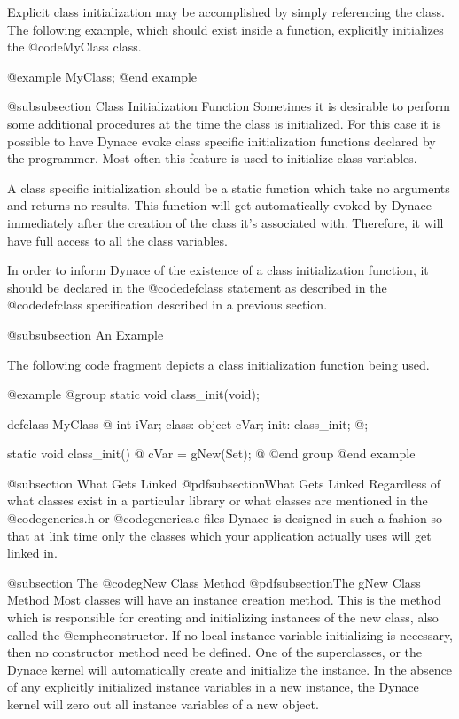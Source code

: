 Explicit class initialization may be accomplished by simply referencing
the class.  The following example, which should exist inside a function,
explicitly initializes the @code{MyClass} class.

@example
        MyClass;
@end example

@subsubsection Class Initialization Function
Sometimes it is desirable to perform some additional procedures at the
time the class is initialized.  For this case it is possible to have
Dynace evoke class specific initialization functions declared by the
programmer.  Most often this feature is used to initialize class
variables.

A class specific initialization should be a static function which
take no arguments and returns no results.  This function will
get automatically evoked by Dynace immediately after the creation
of the class it's associated with.  Therefore, it will have full
access to all the class variables.

In order to inform Dynace of the existence of a class initialization
function, it should be declared in the @code{defclass} statement as
described in the @code{defclass} specification described in a previous
section.


@subsubsection An Example

The following code fragment depicts a class initialization function
being used.

@example
@group
static  void    class_init(void);

defclass  MyClass  @{
        int     iVar;
 class:
        object  cVar;
 init:  class_init;
@};

static  void    class_init()
@{
        cVar = gNew(Set);
@}
@end group
@end example


@subsection What Gets Linked
@pdfsubsection{What Gets Linked}
Regardless of what classes exist in a particular library or what
classes are mentioned in the @code{generics.h} or @code{generics.c}
files Dynace is designed in such a fashion so that at link time
only the classes which your application actually uses will get linked
in.


@subsection The @code{gNew} Class Method
@pdfsubsection{The gNew Class Method}
Most classes will have an instance creation method.  This is the method
which is responsible for creating and initializing instances of the new
class, also called the @emph{constructor}.  If no local instance
variable initializing is necessary, then no constructor method need be
defined.  One of the superclasses, or the Dynace kernel will automatically
create and initialize the instance.  In the absence of any explicitly
initialized instance variables in a new instance, the Dynace kernel will
zero out all instance variables of a new object.

